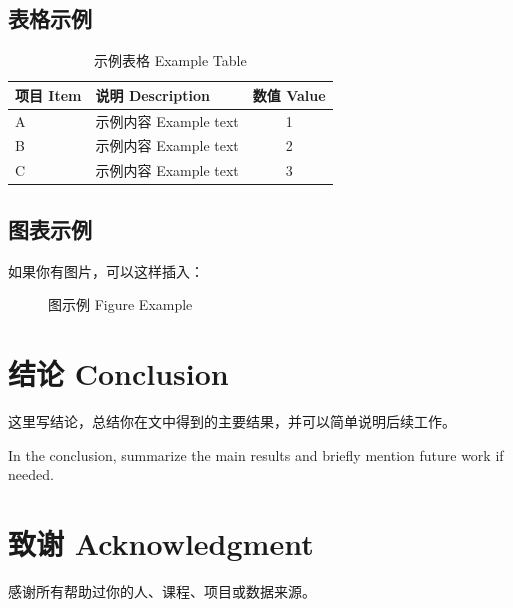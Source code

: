 \documentclass[11pt,a4paper,UTF8]{ctexart}
\begin{document}
\subsection{表格示例}
\begin{table}[ht]
  \centering
  \caption{示例表格 Example Table}
  \begin{tabular}{llc}
    \toprule
    项目 Item & 说明 Description & 数值 Value \\
    \midrule
    A & 示例内容 Example text & 1 \\
    B & 示例内容 Example text & 2 \\
    C & 示例内容 Example text & 3 \\
    \bottomrule
  \end{tabular}
\end{table}

\subsection{图表示例}
如果你有图片，可以这样插入：
\begin{figure}[ht]
  \centering
  \caption{图示例 Figure Example}
\end{figure}

\section{结论 Conclusion}
这里写结论，总结你在文中得到的主要结果，并可以简单说明后续工作。

In the conclusion, summarize the main results and briefly mention future work if needed.

\section*{致谢 Acknowledgment}
感谢所有帮助过你的人、课程、项目或数据来源。
\end{document}
